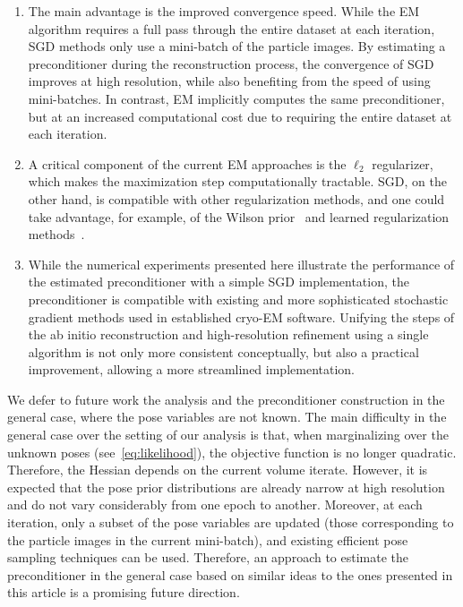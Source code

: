 \documentclass{article}
\begin{document}
\begin{enumerate}
    \item The main advantage is the improved convergence speed. While the EM 
        algorithm requires a full pass through the entire dataset at each iteration, 
        SGD methods only use a mini-batch of the particle images. By estimating
        a preconditioner during the reconstruction process, the convergence
        of SGD improves at high resolution, while also benefiting from the speed 
        of using mini-batches. In contrast, EM implicitly computes the same
        preconditioner, but at an increased computational cost due to requiring 
        the entire dataset at each iteration.

    \item A critical component of the current EM approaches is the $\ell_2$ regularizer,
        which makes the maximization step computationally tractable.
        SGD, on the other hand, is compatible with other regularization methods, 
        and one could take advantage, for example, of the Wilson 
        prior~\cite{gilles_molecular_2022} and learned regularization 
        methods~\cite{kimanius_exploiting_2021,kamilov_plug-and-play_2023,kimanius_data-driven_2024}. 
    
    \item While the numerical experiments presented here illustrate the performance
        of the estimated preconditioner with a simple SGD implementation, the 
        preconditioner is compatible with existing and more sophisticated stochastic
        gradient methods used in established cryo-EM software. Unifying the steps 
        of the ab initio reconstruction and high-resolution refinement using a 
        single algorithm is not only more consistent conceptually, but also a 
        practical improvement, allowing a more streamlined implementation.
\end{enumerate}

We defer to future work the analysis and the preconditioner construction in the 
general case, where the pose variables are not known. The main difficulty in the 
general case over the setting of our analysis is that, when marginalizing over 
the unknown poses (see~\eqref{eq:likelihood}), the objective function is no longer 
quadratic. Therefore, the Hessian depends on the current volume iterate. 
However, it is expected that the pose prior distributions are already narrow at 
high resolution and do not vary considerably from one epoch to another. 
Moreover, at each iteration, only a subset of the pose variables are updated (those 
corresponding to the particle images in the current mini-batch), and existing 
efficient pose sampling techniques can be used.
Therefore, an approach to estimate the preconditioner in the general case based on
similar ideas to the ones presented in this article is a promising future direction.
\end{document}
